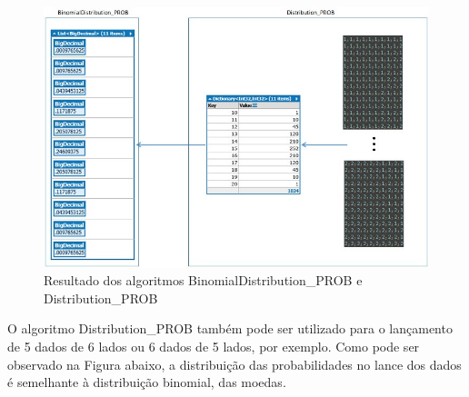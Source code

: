 \begin{apendicesenv}
\begin{figure}[H]
\caption{Resultado dos algoritmos  BinomialDistribution\_PROB e Distribution\_PROB}
\label{fig:BinomialDistribution_PROB_and_Distribution_PROB}
\centering
\includegraphics[scale=.75]{sections/images/BinomialDistribution_PROB_and_Distribution_PROB.jpg}
\end{figure}

O algoritmo Distribution\_PROB também pode ser utilizado para o lançamento de 5 dados de 6 lados ou 6 dados de 5 lados, por exemplo. Como pode ser observado na Figura abaixo, a distribuição das probabilidades no lance dos dados é semelhante à distribuição binomial, das moedas.


\end{apendicesenv}
